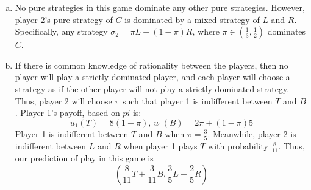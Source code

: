\documentclass{article}
\begin{document}
\begin{enumerate}[(a)]
	\item No pure strategies in this game dominate any other pure strategies. However, player 2's pure strategy of $C$ is dominated by a mixed strategy of $L$ and $R$. Specifically, any strategy $\sigma_2=\pi L + (1-\pi)R$, where $\pi\in(\frac{1}{3},\frac{1}{2})$ dominates $C$.
	
	\item If there is common knowledge of rationality between the players, then no player will play a strictly dominated player, and each player will choose a strategy as if the other player will not play a strictly dominated strategy. Thus, player 2 will choose $\pi$ such that player 1 is indifferent between $T$ and $B$. Player 1's payoff, based on $pi$ is:
		\[
			u_1(T) = 8(1-\pi)\text{, } u_1(B) = 2\pi + (1-\pi)5
		\]
		Player 1 is indifferent between $T$ and $B$ when $\pi = \frac{3}{5}$. Meanwhile, player 2 is indifferent between $L$ and $R$ when player 1 plays $T$ with probability $\frac{8}{11}$. Thus, our prediction of play in this game is
		\[
			\left(\frac{8}{11}T + \frac{3}{11}B, \frac{3}{5}L + \frac{2}{5}R\right)
		\]
\end{enumerate}


\end{document}
